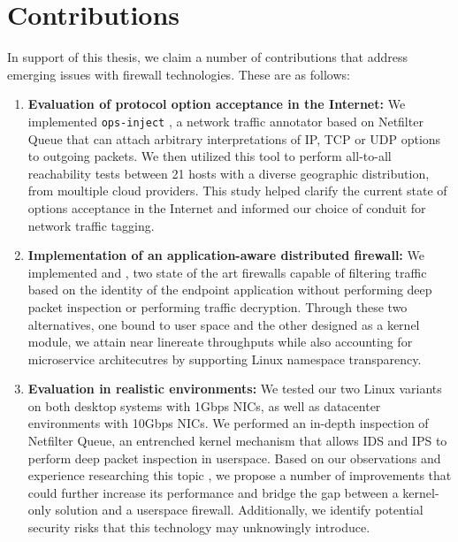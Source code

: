 \section{Contributions}
\label{conclusion:contrib}

In support of this thesis, we claim a number of contributions that address
emerging issues with firewall technologies. These are as follows:

\begin{enumerate}
    \item \textbf{Evaluation of protocol option acceptance in the Internet:}
    We implemented \texttt{ops-inject} \cite{mantu2024framework}, a network
    traffic annotator based on Netfilter Queue that can attach arbitrary
    interpretations of IP, TCP or UDP options to outgoing packets. We then
    utilized this tool to perform all-to-all reachability tests between 21
    hosts with a diverse geographic distribution, from moultiple cloud providers.
    This study helped clarify the current state of options acceptance in the
    Internet and informed our choice of conduit for network traffic tagging.

    \item \textbf{Implementation of an application-aware distributed firewall:}
    We implemented \daf{} \cite{mantu2024process} and \scout{} ,
    two state of the art firewalls capable of filtering traffic based on the
    identity of the endpoint application without performing deep packet inspection
    or performing traffic decryption. Through these two alternatives, one
    bound to user space and the other designed as a kernel module, we attain near
    linereate throughputs while also accounting for microservice architecutres
    by supporting Linux namespace transparency.

    \item \textbf{Evaluation in realistic environments:} We tested our two Linux
    variants on both desktop systems with 1Gbps NICs, as well as datacenter
    environments with 10Gbps NICs. We performed an in-depth inspection of Netfilter
    Queue, an entrenched kernel mechanism that allows IDS and IPS to perform
    deep packet inspection in userspace. Based on our observations and experience
    researching this topic \cite{gherghescu2024ve}, we propose a number of
    improvements that could further increase its performance and bridge the gap
    between a kernel-only solution and a userspace firewall. Additionally, we
    identify potential security risks that this technology may unknowingly introduce.


\end{enumerate}
